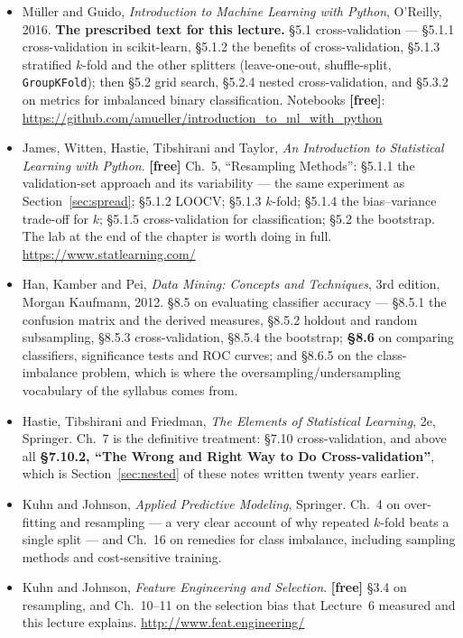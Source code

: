 \documentclass[11pt]{article}
\begin{document}
\begin{itemize}[leftmargin=*]
  \item M\"uller and Guido, \emph{Introduction to Machine Learning with
    Python}, O'Reilly, 2016. \textbf{The prescribed text for this lecture.}
    \S5.1 cross-validation --- \S5.1.1 cross-validation in scikit-learn,
    \S5.1.2 the benefits of cross-validation, \S5.1.3 stratified $k$-fold and
    the other splitters (leave-one-out, shuffle-split,
    \texttt{GroupKFold}); then \S5.2 grid search, \S5.2.4 nested
    cross-validation, and \S5.3.2 on metrics for imbalanced binary
    classification. Notebooks \textbf{[free]}:
    \url{https://github.com/amueller/introduction_to_ml_with_python}
  \item James, Witten, Hastie, Tibshirani and Taylor, \emph{An Introduction to
    Statistical Learning with Python}. \textbf{[free]} Ch.~5, ``Resampling
    Methods'': \S5.1.1 the validation-set approach and its variability --- the
    same experiment as Section~\ref{sec:spread}; \S5.1.2 LOOCV; \S5.1.3
    $k$-fold; \S5.1.4 the bias--variance trade-off for $k$; \S5.1.5
    cross-validation for classification; \S5.2 the bootstrap. The lab at the
    end of the chapter is worth doing in full.
    \url{https://www.statlearning.com/}
  \item Han, Kamber and Pei, \emph{Data Mining: Concepts and Techniques}, 3rd
    edition, Morgan Kaufmann, 2012. \S8.5 on evaluating classifier accuracy
    --- \S8.5.1 the confusion matrix and the derived measures, \S8.5.2 holdout
    and random subsampling, \S8.5.3 cross-validation, \S8.5.4 the bootstrap;
    \textbf{\S8.6} on comparing classifiers, significance tests and ROC
    curves; and \S8.6.5 on the class-imbalance problem, which is where the
    oversampling/undersampling vocabulary of the syllabus comes from.
  \item Hastie, Tibshirani and Friedman, \emph{The Elements of Statistical
    Learning}, 2e, Springer. Ch.~7 is the definitive treatment: \S7.10
    cross-validation, and above all \textbf{\S7.10.2, ``The Wrong and Right
    Way to Do Cross-validation''}, which is Section~\ref{sec:nested} of these
    notes written twenty years earlier.
  \item Kuhn and Johnson, \emph{Applied Predictive Modeling}, Springer. Ch.~4
    on over-fitting and resampling --- a very clear account of why repeated
    $k$-fold beats a single split --- and Ch.~16 on remedies for class
    imbalance, including sampling methods and cost-sensitive training.
  \item Kuhn and Johnson, \emph{Feature Engineering and Selection}.
    \textbf{[free]} \S3.4 on resampling, and Ch.~10--11 on the selection bias
    that Lecture~6 measured and this lecture explains.
    \url{http://www.feat.engineering/}
\end{itemize}
\end{document}
